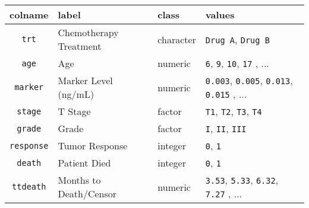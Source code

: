 \captionsetup[table]{labelformat=empty,skip=1pt}
\begin{longtable}{clll}
\toprule
colname & label & class & values \\ 
\midrule
\texttt{\textquotedbl{}trt\textquotedbl{}} & Chemotherapy Treatment & character & \texttt{Drug A}, \texttt{Drug B} \\ 
\texttt{\textquotedbl{}age\textquotedbl{}} & Age & numeric & \texttt{6}, \texttt{9}, \texttt{10}, \texttt{17} , ... \\ 
\texttt{\textquotedbl{}marker\textquotedbl{}} & Marker Level (ng/mL) & numeric & \texttt{0.003}, \texttt{0.005}, \texttt{0.013}, \texttt{0.015} , ... \\ 
\texttt{\textquotedbl{}stage\textquotedbl{}} & T Stage & factor & \texttt{T1}, \texttt{T2}, \texttt{T3}, \texttt{T4} \\ 
\texttt{\textquotedbl{}grade\textquotedbl{}} & Grade & factor & \texttt{I}, \texttt{II}, \texttt{III} \\ 
\texttt{\textquotedbl{}response\textquotedbl{}} & Tumor Response & integer & \texttt{0}, \texttt{1} \\ 
\texttt{\textquotedbl{}death\textquotedbl{}} & Patient Died & integer & \texttt{0}, \texttt{1} \\ 
\texttt{\textquotedbl{}ttdeath\textquotedbl{}} & Months to Death/Censor & numeric & \texttt{3.53}, \texttt{5.33}, \texttt{6.32}, \texttt{7.27} , ... \\ 
\bottomrule
\end{longtable}

